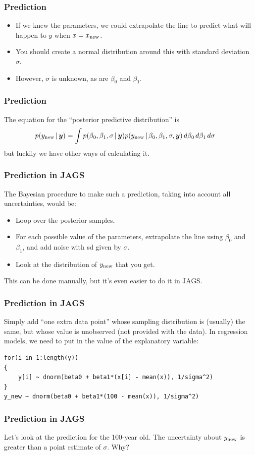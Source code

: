 \documentclass{beamer}
\newcommand{\given}{\,|\,}
\begin{document}
\begin{frame}
\frametitle{Prediction}
\begin{itemize}
\item If we knew the parameters, we could extrapolate the line to predict
what will happen to $y$ when $x=x_{\rm new}$.\pause
\item You should create a normal distribution around this with standard deviation
$\sigma$.\pause
\item However, $\sigma$ is unknown, as are $\beta_0$ and $\beta_1$.
\end{itemize}
\end{frame}

\begin{frame}
\frametitle{Prediction}
The equation for the ``posterior predictive distribution'' is
\begin{align}
p(y_{\rm new} \given \boldsymbol{y})
    &= \int 
            p(\beta_0, \beta_1, \sigma \given \boldsymbol{y})
p(y_{\rm new} \given \beta_0, \beta_1, \sigma, \boldsymbol{y})\, d\beta_0 \, d\beta_1 \, d\sigma
\end{align}
but luckily we have other ways of calculating it.

\end{frame}


\begin{frame}
\frametitle{Prediction in JAGS}
The Bayesian procedure to make such a prediction, taking into account all
uncertainties, would be:
\begin{itemize}
\item Loop over the posterior samples.\pause
\item For each possible value of the parameters,
extrapolate the line using $\beta_0$ and $\beta_1$, and add noise with sd
given by $\sigma$.\pause
\item Look at the distribution of $y_{\rm new}$ that you get.\pause
\end{itemize}
This can be done manually, but it's even easier to do it in JAGS.

\end{frame}



\begin{frame}[fragile]
\frametitle{Prediction in JAGS}
Simply add ``one extra data point'' whose sampling distribution is (usually)
the same, but whose value is unobserved (not provided with the data).
In regression models, we need to put in the value of the explanatory variable:
\begin{verbatim}
for(i in 1:length(y))
{
    y[i] ~ dnorm(beta0 + beta1*(x[i] - mean(x)), 1/sigma^2)
}
y_new ~ dnorm(beta0 + beta1*(100 - mean(x)), 1/sigma^2)
\end{verbatim}
\end{frame}


\begin{frame}[fragile]
\frametitle{Prediction in JAGS}
\large

Let's look at the prediction for the 100-year old.
The uncertainty about $y_{\rm new}$ is greater than
a point estimate of $\sigma$. Why?
\end{frame}
\end{document}
